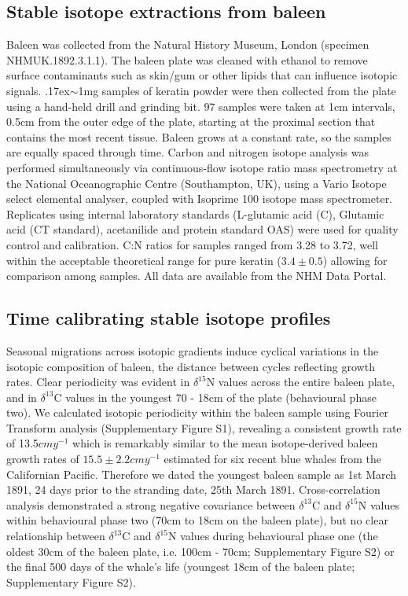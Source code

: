 \documentclass[a4paper,12pt]{article}
\begin{document}
\subsection{Stable isotope extractions from baleen}
Baleen was collected from the Natural History Museum, London (specimen NHMUK.1892.3.1.1). 
The baleen plate was cleaned with ethanol to remove surface contaminants such as skin/gum or other lipids that can influence isotopic signals. 
{\raise.17ex\hbox{$\scriptstyle\sim$}}1mg samples of keratin powder were then collected from the plate using a hand-held drill and grinding bit. 
97 samples were taken at 1cm intervals, 0.5cm from the outer edge of the plate, starting at the proximal section that contains the most recent tissue. 
Baleen grows at a constant rate, so the samples are equally spaced through time\cite{best1996stable}. 
Carbon and nitrogen isotope analysis was performed simultaneously via continuous-flow isotope ratio mass spectrometry at the National Oceanographic Centre (Southampton, UK), using a Vario Isotope select elemental analyser, coupled with Isoprime 100 isotope mass spectrometer. 
Replicates using internal laboratory standards (L-glutamic acid (C), Glutamic acid (CT standard), acetanilide and protein standard OAS) were used for quality control and calibration. 
C:N ratios for samples ranged from 3.28\text{\textperthousand} to 3.72\text{\textperthousand}, well within the acceptable theoretical range for pure keratin ($3.4\pm0.5$) allowing for comparison among samples\cite{hobson1998stable}. 
All data are available from the NHM Data Portal\cite{data-set}.
 
\subsection{Time calibrating stable isotope profiles}
Seasonal migrations across isotopic gradients induce cyclical variations in the isotopic composition of baleen, the distance between cycles reflecting growth rates\cite{hobson1998stable,busquets2017estimating}. 
Clear periodicity was evident in $\delta^{15}$N values across the entire baleen plate, and in $\delta^{13}$C values in the youngest 70 - 18cm of the plate (behavioural phase two). 
We calculated isotopic periodicity within the baleen sample using Fourier Transform analysis\cite{cardona2017temporal} (Supplementary Figure S1), revealing a consistent growth rate of 13.5$cmy^{-1}$ which is remarkably similar to the mean isotope-derived baleen growth rates of $15.5 \pm 2.2cmy^{-1}$ estimated for six recent blue whales from the Californian Pacific\cite{busquets2017estimating}.  
Therefore we dated the youngest baleen sample as 1st March 1891, 24 days prior to the stranding date, 25th March 1891. 
Cross-correlation analysis demonstrated a strong negative covariance between $\delta^{13}$C and $\delta^{15}$N values within behavioural phase two (70cm to 18cm on the baleen plate), but no clear relationship between $\delta^{13}$C and $\delta^{15}$N values during behavioural phase one (the oldest 30cm of the baleen plate, i.e. 100cm - 70cm; Supplementary Figure S2) or the final 500 days of the whale's life (youngest 18cm of the baleen plate; Supplementary Figure S2).
 
\end{document}
